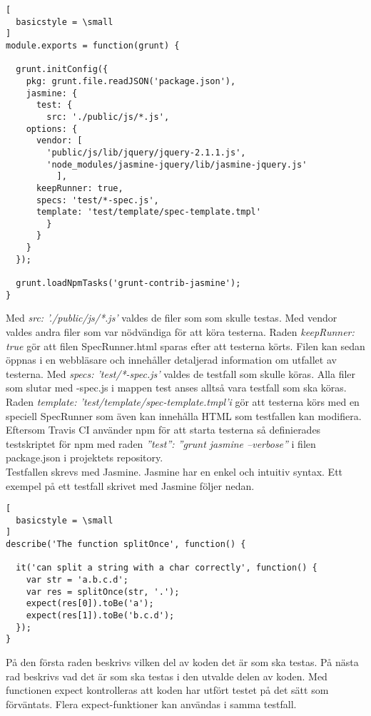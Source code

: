 \begin{lstlisting}[
  basicstyle = \small
]
module.exports = function(grunt) {

  grunt.initConfig({
    pkg: grunt.file.readJSON('package.json'),
    jasmine: {
      test: {
        src: './public/js/*.js',
	options: {
	  vendor: [
	    'public/js/lib/jquery/jquery-2.1.1.js',
	    'node_modules/jasmine-jquery/lib/jasmine-jquery.js'
          ],
	  keepRunner: true,
	  specs: 'test/*-spec.js',
	  template: 'test/template/spec-template.tmpl'
        }
      }
    }
  });

  grunt.loadNpmTasks('grunt-contrib-jasmine');
}
\end{lstlisting}

Med \emph{src: './public/js/*.js'} valdes de filer som som skulle testas.
Med vendor valdes andra filer som var nödvändiga för att köra testerna.
Raden \emph{keepRunner: true} gör att filen \textunderscore SpecRunner.html sparas efter att
testerna körts. Filen kan sedan öppnas i en webbläsare och innehåller
detaljerad information om utfallet av testerna.
Med \emph{specs: 'test/*-spec.js'} valdes de testfall som skulle köras.
Alla filer som slutar med -spec.js i mappen test anses alltså vara
testfall som ska köras.
Raden \emph{template: 'test/template/spec-template.tmpl'i} gör att testerna
körs med en speciell SpecRunner som även kan innehålla HTML som testfallen
kan modifiera.
Eftersom Travis CI använder npm för att starta 
testerna så definierades testskriptet för npm med raden
\emph{''test'': ''grunt jasmine --verbose''} i filen package.json 
i projektets repository.\\

Testfallen skrevs med Jasmine. Jasmine har en enkel och intuitiv syntax.
Ett exempel på ett testfall skrivet med Jasmine följer nedan.

\begin{lstlisting}[
  basicstyle = \small
]
describe('The function splitOnce', function() {
	
  it('can split a string with a char correctly', function() {
    var str = 'a.b.c.d';
    var res = splitOnce(str, '.');
    expect(res[0]).toBe('a');
    expect(res[1]).toBe('b.c.d');
  });
}
\end{lstlisting}

På den första raden beskrivs vilken del av koden det är som ska testas.
På nästa rad beskrivs vad det är som ska testas i den utvalde delen av koden.
Med functionen expect kontrolleras att koden har utfört testet på det sätt
som förväntats. Flera expect-funktioner kan användas i samma testfall.\\

